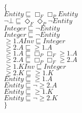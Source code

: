 \documentclass[a4paper,10pt]{article}
\begin{document}
 \newcommand{\nxt}{{\ensuremath\raisebox{0.25ex}{\text{\scriptsize$\bigcirc$}}}}
\newcommand{\Rdiamond}{\Diamond_{\!F}}
\newcommand{\Rbox}{\Box_{\!F}}
\newcommand{\Rnext}{\nxt_{\!F}}
\newcommand{\Ldiamond}{\Diamond_{\!P}}
\newcommand{\Lbox}{\Box_{\!P}}
\newcommand{\Lnext}{\nxt_{\!P}}
\newcommand{\SVdiamond}{\mathop{\ooalign{$\Diamond$ \cr \kern0.5ex
    \raisebox{0.35ex}{\scalebox{0.7}{$*$}}} \kern-0.9ex}}
\newcommand{\SVbox}{\mathop{\ooalign{$\Box$ \cr \kern0.42ex
    \raisebox{0.3ex}{\scalebox{0.7}{$*$}}} \kern-0.9ex}}


 $\{$\\ 
$Entity \sqsubseteq  \Rbox  \Lbox Entity$\\ 
 $ \lnot  \bot  \sqsubseteq  \Rdiamond  \Ldiamond  \lnot Entity$\\ 
 $Integer \sqsubseteq  \lnot Entity$\\ 
 $Integer \sqsubseteq  \lnot Entity$\\ 
 $ \ge 1.AInv \sqsubseteq Integer$\\ 
 $ \ge 2.A \sqsubseteq  \ge 1.A$\\ 
 $ \ge 1.A \sqsubseteq  \Lbox  \Rbox  \ge 1.A$\\ 
 $ \ge 2.A \sqsubseteq  \Lbox  \Rbox  \ge 2.A$\\ 
 $ \ge 1.KInv \sqsubseteq Integer$\\ 
 $ \ge 2.K \sqsubseteq  \ge 1.K$\\ 
 $Entity \sqsubseteq  \ge 1.A$\\ 
 $Entity \sqsubseteq  \lnot  \ge 2.A$\\ 
 $Entity \sqsubseteq  \ge 1.K$\\ 
 $Entity \sqsubseteq  \lnot  \ge 2.K$\\ 
 $\}$ 
\end{document}
